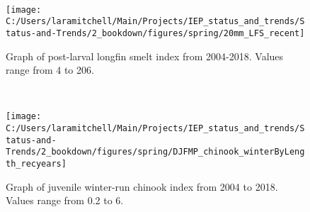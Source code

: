 \documentclass[
]{book}
\begin{document}
\begin{panel-grid}
\begin{columns-nocenter}
\begin{column800}
\begin{expand}
\end{expand}

\end{column800}

\begin{column40}

~

\end{column40}

\begin{column800}

\begin{expand}

\begin{figure}
\texttt{[image: C:/Users/laramitchell/Main/Projects/IEP\_status\_and\_trends/Status-and-Trends/2\_bookdown/figures/spring/20mm\_LFS\_recent]} \caption{Graph of post-larval longfin smelt index from 2004-2018. Values range from 4 to 206.}\label{fig:unnamed-chunk-44}
\end{figure}

\end{expand}

\end{column800}

\begin{column40}

~

\end{column40}

\begin{column800}

\begin{expand}

\begin{figure}
\texttt{[image: C:/Users/laramitchell/Main/Projects/IEP\_status\_and\_trends/Status-and-Trends/2\_bookdown/figures/spring/DJFMP\_chinook\_winterByLength\_recyears]} \caption{Graph of juvenile winter-run chinook index from 2004 to 2018. Values range from 0.2 to 6.}\label{fig:unnamed-chunk-45}
\end{figure}

\end{expand}

\end{column800}

\end{columns-nocenter}

\begin{columns-nocenter}

\begin{column800}


\end{column800}
\end{columns-nocenter}
\end{panel-grid}
\end{document}
